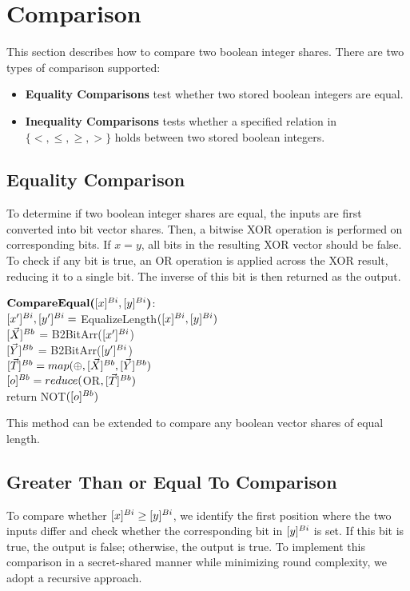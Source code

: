 \section{Comparison}

This section describes how to compare two boolean integer shares.
There are two types of comparison supported:
\begin{itemize}
	\item{\bf Equality Comparisons} test whether two stored boolean integers are equal.
	\item{\bf Inequality Comparisons} tests whether a specified relation in $\{<, \leq, \geq, >\}$ holds between two stored boolean integers.
\end{itemize}

\subsection{Equality Comparison} 

To determine if two boolean integer shares are equal, the inputs are first converted into bit vector shares. Then, a bitwise XOR operation is performed on corresponding bits. If $x = y$, all bits in the resulting XOR vector should be false. To check if any bit is true, an OR operation is applied across the XOR result, reducing it to a single bit. The inverse of this bit is then returned as the output. 

\begin{protocol}
	$\textbf{CompareEqual(}[x]^{Bi}, [y]^{Bi}\textbf{)}$:\\
	\indent $[x']^{Bi}, [y']^{Bi}=$ EqualizeLength$([x]^{Bi}, [y]^{Bi})$ \\
	\indent $[\vec{X}]^{Bb}$ = B2BitArr($[x']^{Bi}$)\\
	\indent $[\vec{Y}]^{Bb}$ = B2BitArr($[y']^{Bi}$)\\
	\indent $[\vec{T}]^{Bb} = map(\oplus, [\vec{X}]^{Bb}, [\vec{Y}]^{Bb})$ \\	
	\indent $[o]^{Bb} = reduce($OR$, [\vec{T}]^{Bb})$ \\
	\indent return NOT$([o]^{Bb})$ \\
\end{protocol}

This method can be extended to compare any boolean vector shares of equal length.


\subsection{Greater Than or Equal To Comparison} 
To compare whether $[x]^{Bi} \geq [y]^{Bi}$, we identify the first position where the two inputs differ and check whether the corresponding bit in $[y]^{Bi}$ is set. If this bit is true, the output is false; otherwise, the output is true. To implement this comparison in a secret-shared manner while minimizing round complexity, we adopt a recursive approach.

